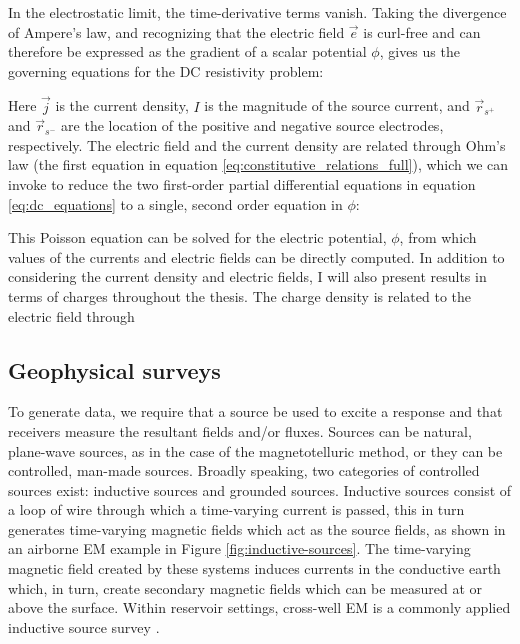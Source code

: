 In the electrostatic limit, the time-derivative terms vanish. Taking the divergence of Ampere's law, and recognizing that the electric field $\vec{e}$ is curl-free and can therefore be expressed as the gradient of a scalar potential $\phi$, gives us the governing equations for the DC resistivity problem:

Here $\vec{j}$ is the current density, $I$ is the magnitude of the source current, and $\vec{r}_{s^+}$ and $\vec{r}_{s^-}$ are the location of the positive and negative source electrodes, respectively. The electric field and the current density are related through Ohm's law (the first equation in equation \ref{eq:constitutive_relations_full}), which we can invoke to reduce the two first-order partial differential equations in equation \ref{eq:dc_equations} to a single, second order equation in $\phi$:

This Poisson equation can be solved for the electric potential, $\phi$, from which values of the currents and electric fields can be directly computed. In addition to considering the current density and electric fields, I will also present results in terms of charges throughout the thesis. The charge density is related to the electric field through


\subsection{Geophysical surveys}
To generate data, we require that a source be used to excite a response and that receivers measure the resultant fields and/or fluxes. Sources can be natural, plane-wave sources, as in the case of the magnetotelluric method, or they can be controlled, man-made sources. Broadly speaking, two categories of controlled sources exist: inductive sources and grounded sources. Inductive sources consist of a loop of wire through which a time-varying current is passed, this in turn generates time-varying magnetic fields which act as the source fields, as shown in an airborne EM example in Figure \ref{fig:inductive-sources}. The time-varying magnetic field created by these systems induces currents in the conductive earth which, in turn, create secondary magnetic fields which can be measured at or above the surface. Within reservoir settings, cross-well EM is a commonly applied inductive source survey \citep{Wilt1995}.







